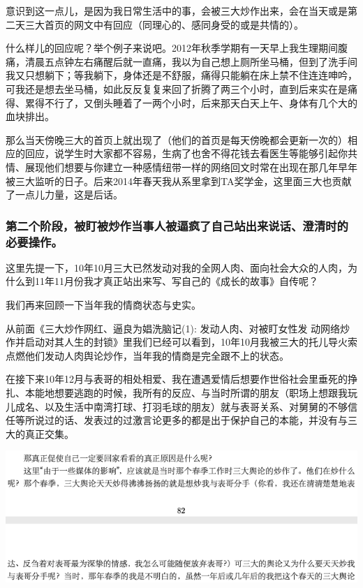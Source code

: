 \documentclass[9pt, b5paper]{article}
\begin{document}
意识到这一点儿，是因为我日常生活中的事，会被三大炒作出来，会在当天或是第二天三大首页的网文中有回应（同理心的、感同身受的或是共情的）。

什么样儿的回应呢？举个例子来说吧。2012年秋季学期有一天早上我生理期间腹痛，清晨五点钟左右痛醒后就一直痛，我以为自己想上厕所坐马桶，但到了洗手间我又只想躺下；等我躺下，身体还是不舒服，痛得只能躺在床上禁不住连连呻吟，可我还是想去坐马桶，如此反反复复来回了折腾了两三个小时，直到后来实在是痛得、累得不行了，又倒头睡着了一两个小时，后来那天白天上午、身体有几个大的血块排出。

那么当天傍晚三大的首页上就出现了（他们的首页是每天傍晚都会更新一次的）相应的回应，说学生时大家都不容易，生病了也舍不得花钱去看医生等能够引起你共情、展现他们想要与你建立一种感情纽带一样的网络回文时常在出现在那几年早年被三大监听的日子。后来2014年春天我从系里拿到TA奖学金，这里面三大也贡献了一点儿力量，这是后话。 

\subsubsection{第二个阶段，被盯被炒作当事人被逼疯了自己站出来说话、澄清时的必要操作。}
\label{sec:orgb9ce3f0}

这里先提一下，10年10月三大已然发动对我的全网人肉、面向社会大众的人肉，为什么到11年11月份我才真正站出来写、写自己的《成长的故事》自传呢？

我们再来回顾一下当年我的情商状态与史实。 

从前面《三大炒作网红、逼良为娼洗脑记(1): 发动人肉、对被盯女性发 动网络炒作并启动对其人生的封锁》里我们已经可以看到，10年10月我被三大的托儿导火索点燃他们发动人肉舆论炒作，当年我的情商是完全跟不上的状态。 

在接下来10年12月与表哥的相处相爱、我在遭遇爱情后想要作世俗社会里垂死的挣扎、本能地想要逃跑的时候，我所有的反应、与当时所谓的朋友（职场上想跟我玩儿成名、以及生活中南湾打球、打羽毛球的朋友）就与表哥关系、对舅舅的不够信任等所说过的话、发表过的过激言论更多的都是出于保护自己的本能，并没有与三大的真正交集。

\begin{center}
\includegraphics[width=.9\linewidth]{./pic/backups_plans_20210412_173011.png}
\end{center}
\end{document}

